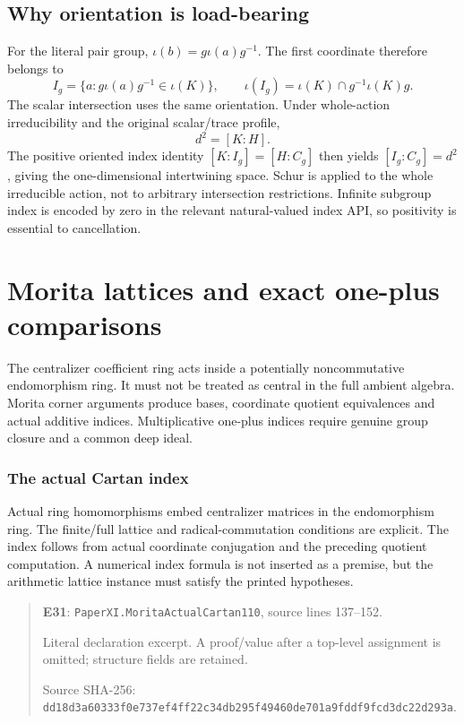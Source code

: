 \documentclass[10pt,oneside]{book}
\begin{document}

\section{Why orientation is load-bearing}
For the literal pair group, \(\iota(b)=g\iota(a)g^{-1}\). The first coordinate therefore belongs to
\[
 I_g=\{a:g\iota(a)g^{-1}\in\iota(K)\},
 \qquad \iota(I_g)=\iota(K)\cap g^{-1}\iota(K)g.
\]
The scalar intersection uses the same orientation. Under whole-action irreducibility and the original scalar/trace profile,
\[
 d^2=[K:H].
\]
The positive oriented index identity \([K:I_g]=[H:C_g]\) then yields \([I_g:C_g]=d^2\), giving the one-dimensional intertwining space. Schur is applied to the whole irreducible action, not to arbitrary intersection restrictions. Infinite subgroup index is encoded by zero in the relevant natural-valued index API, so positivity is essential to cancellation.

\chapter{Morita lattices and exact one-plus comparisons}
The centralizer coefficient ring acts inside a potentially noncommutative endomorphism ring. It must not be treated as central in the full ambient algebra. Morita corner arguments produce bases, coordinate quotient equivalences and actual additive indices. Multiplicative one-plus indices require genuine group closure and a common deep ideal.

\subsection{The actual Cartan index}
\label{guide:E31}
Actual ring homomorphisms embed centralizer matrices in the endomorphism ring. The finite/full lattice and radical-commutation conditions are explicit.
The index follows from actual coordinate conjugation and the preceding quotient computation. A numerical index formula is not inserted as a premise, but the arithmetic lattice instance must satisfy the printed hypotheses.

\begin{quote}\footnotesize\textbf{E31}: \nolinkurl{PaperXI.MoritaActualCartan110}, source lines 137--152.\par Literal declaration excerpt. A proof/value after a top-level assignment is omitted; structure fields are retained.\par Source SHA-256: {\scriptsize\texttt{dd18d3a60333f0e737ef4ff22c34db295f49460de701a9fddf9fcd3dc22d293a}}.\end{quote}
\end{document}
